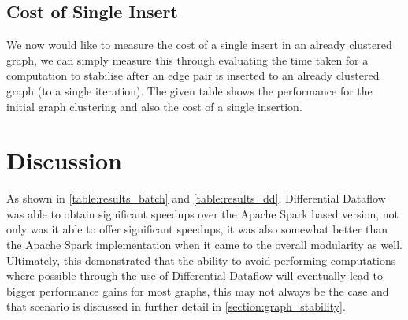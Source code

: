 \subsection{Cost of Single Insert}
We now would like to measure the cost of a single insert in an already clustered graph, we can simply measure this through evaluating the time taken for a computation to stabilise after an edge pair is inserted to an already clustered graph (to a single iteration). The given table shows the performance for the initial graph clustering and also the cost of a single insertion. 
\begin{table}[H]
    \centering
    \label{table:results_dd_insertions}
    \caption{Result from single edge insertion with Differential Dataflow}
\end{table}

\section{Discussion}
As shown in \cref{table:results_batch} and \cref{table:results_dd}, Differential Dataflow was able to obtain significant speedups over the Apache Spark based version, not only was it able to offer significant speedups, it was also somewhat better than the Apache Spark implementation when it came to the overall modularity as well. Ultimately, this demonstrated that the ability to avoid performing computations where possible through the use of Differential Dataflow will eventually lead to bigger performance gains for most graphs, this may not always be the case and that scenario is discussed in further detail in \cref{section:graph_stability}. 

